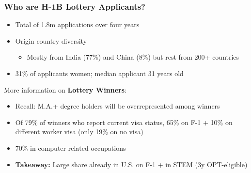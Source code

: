 \documentclass[xcolor=dvipsnames, compress, 12pt, aspectratio=169, handout]{beamer}
\begin{document}
\begin{frame}\label{h1b_apps_summ}
    \frametitle{Who are H-1B Lottery Applicants?}
    \begin{itemize}
        \item Total of 1.8m applications over four years \hyperlink{sankey}{}
        \vspace{1mm}
        \item Origin country diversity 
            \begin{itemize}
                \item Mostly from India (77\%) and China (8\%) but rest from 200+ countries \hyperlink{h1b_apps_cob}{}
            \end{itemize}
        \vspace{1mm}
        \item 31\% of applicants women; median applicant 31 years old
    \end{itemize}
    \vspace{2mm}
    More information on \textbf{Lottery Winners}:
    \vspace{1mm}
    \begin{itemize}
        \item Recall: M.A.+ degree holders will be overrepresented among winners \hyperlink{win_stats}{}
        \vspace{1mm}
        \item Of 79\% of winners who report current visa status, 65\% on F-1 + 10\% on different worker visa (only 19\% on no visa)
        \vspace{1mm}
        \item 70\% in computer-related occupations
        \vspace{1mm}
        \item \textbf{Takeaway:} Large share already in U.S. on F-1 + in STEM (3y OPT-eligible) 
    \end{itemize}    
\end{frame}
\end{document}
